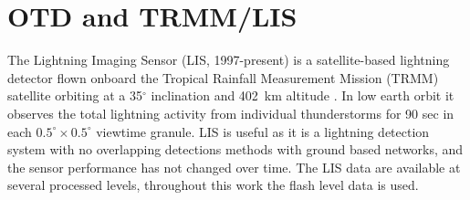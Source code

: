 \section{OTD and TRMM/LIS}

The Lightning Imaging Sensor (LIS, 1997-present) is a satellite-based lightning detector flown onboard the Tropical Rainfall Measurement Mission (TRMM) satellite orbiting at a 35$^\circ$ inclination and 402~km altitude \citep{Christian1999}.
In low earth orbit it observes the total lightning activity from individual thunderstorms for 90 sec in each $0.5^\circ \times 0.5^\circ$ viewtime granule.
LIS is useful as it is a lightning detection system with no overlapping detections methods with ground based networks, and the sensor performance has not changed over time.
The LIS data are available at several processed levels, throughout this work the flash level data is used.

